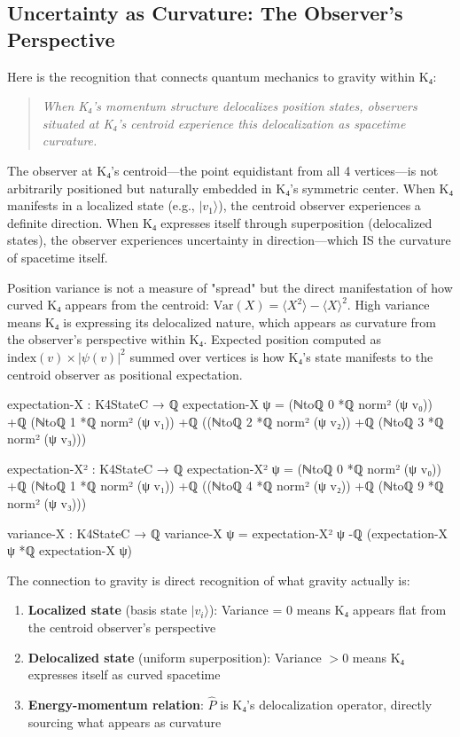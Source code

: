 \documentclass[11pt,a4paper]{book}
\begin{document}
\subsection{Uncertainty as Curvature: The Observer's Perspective}

Here is the recognition that connects quantum mechanics to gravity within K₄:
\begin{quote}
\emph{When K₄'s momentum structure delocalizes position states, observers situated at K₄'s centroid experience this delocalization as spacetime curvature.}
\end{quote}

The observer at K₄'s centroid—the point equidistant from all 4 vertices—is not arbitrarily positioned but naturally embedded in K₄'s symmetric center. When K₄ manifests in a localized state (e.g., $|v_1\rangle$), the centroid observer experiences a definite direction. When K₄ expresses itself through superposition (delocalized states), the observer experiences uncertainty in direction—which IS the curvature of spacetime itself.

Position variance is not a measure of "spread" but the direct manifestation of how curved K₄ appears from the centroid: $\text{Var}(X) = \langle X^2\rangle - \langle X\rangle^2$. High variance means K₄ is expressing its delocalized nature, which appears as curvature from the observer's perspective within K₄. Expected position computed as $\text{index}(v) \times |\psi(v)|^2$ summed over vertices is how K₄'s state manifests to the centroid observer as positional expectation.

\begin{code}
expectation-X : K4StateC → ℚ
expectation-X ψ = (ℕtoℚ 0 *ℚ norm² (ψ v₀)) +ℚ (ℕtoℚ 1 *ℚ norm² (ψ v₁))
              +ℚ ((ℕtoℚ 2 *ℚ norm² (ψ v₂)) +ℚ (ℕtoℚ 3 *ℚ norm² (ψ v₃)))

expectation-X² : K4StateC → ℚ
expectation-X² ψ = (ℕtoℚ 0 *ℚ norm² (ψ v₀)) +ℚ (ℕtoℚ 1 *ℚ norm² (ψ v₁))
               +ℚ ((ℕtoℚ 4 *ℚ norm² (ψ v₂)) +ℚ (ℕtoℚ 9 *ℚ norm² (ψ v₃)))

variance-X : K4StateC → ℚ
variance-X ψ = expectation-X² ψ -ℚ (expectation-X ψ *ℚ expectation-X ψ)
\end{code}

The connection to gravity is direct recognition of what gravity actually is:

\begin{enumerate}
\item \textbf{Localized state} (basis state $|v_i\rangle$): 
      Variance = 0 means K₄ appears flat from the centroid observer's perspective
\item \textbf{Delocalized state} (uniform superposition): 
      Variance $> 0$ means K₄ expresses itself as curved spacetime
\item \textbf{Energy-momentum relation}: 
      $\hat{P}$ is K₄'s delocalization operator, directly sourcing what appears as curvature
\end{enumerate}
\end{document}
